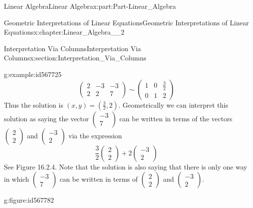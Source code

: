 \documentclass[oneside,10pt,]{book}
\numberwithin{equation}{section}
\newcommand{\amp}{&}
\begin{document}
\begin{partptx}{Linear Algebra}{}{Linear Algebra}{}{}{x:part:Part-Linear_Algebra}
\begin{chapterptx}{Geometric Interpretations of Linear Equations}{}{Geometric Interpretations of Linear Equations}{}{}{x:chapter:Linear_Algebra__2}
\begin{sectionptx}{Interpretation Via Columns}{}{Interpretation Via Columns}{}{}{x:section:Interpretation_Via_Columns}
\begin{example}{}{g:example:id567725}
\begin{equation*}
\begin{pmatrix} 2 \amp -3 \amp -3 \\ 2 \amp 2 \amp 7 \end{pmatrix} \sim \begin{pmatrix} 1 \amp 0 \amp \frac{3}{2} \\ 0 \amp 1 \amp 2 \end{pmatrix}
\end{equation*}
Thus the solution is \((x,y)=\left(\frac{3}{2},2 \right)\). Geometrically we can interpret this solution as saying the vector \(\begin{pmatrix} -3 \\ 7 \end{pmatrix}\) can be written in terms of the vectors \(\begin{pmatrix} 2 \\ 2 \end{pmatrix}\) and \(\begin{pmatrix} -3 \\ 2 \end{pmatrix}\) via the expression%
\begin{equation*}
\frac{3}{2} \begin{pmatrix} 2 \\ 2 \end{pmatrix} +2 \begin{pmatrix} -3 \\ 2 \end{pmatrix} 
\end{equation*}
See Figure 16.2.4. Note that the solution is also saying that there is only one way in which \(\begin{pmatrix} -3 \\ 7 \end{pmatrix}\) can be written in terms of \(\begin{pmatrix} 2 \\ 2 \end{pmatrix}\) and \(\begin{pmatrix} -3 \\ 2 \end{pmatrix}\). \begin{figureptx}{}{g:figure:id567782}{}%
\begin{image}{0.2}{0.6}{0.2}%

\end{image}
\end{figureptx}
\end{example}
\end{sectionptx}
\end{chapterptx}
\end{partptx}
\end{document}
